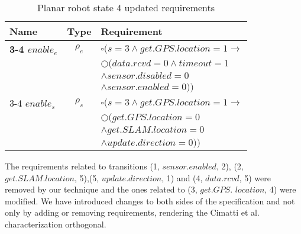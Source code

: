 \begin{center}
\begin{table}[h]
  \begin{tabular}{ l  c  l }
	Name & Type & Requirement \\
    \hline
    \textbf{3-4 $enable_e$} & $\rho_e$ & $\square(s=3 \wedge get.GPS.location = 1 \rightarrow$\\
    &&$\Circle(data.rcvd=0 \wedge timeout = 1$\\
    &&$\wedge sensor.disabled = 0$\\
    &&$\wedge sensor.enabled = 0))$\\
    3-4 $enable_s$ & $\rho_s$ & $\square(s=3 \wedge get.GPS.location = 1 \rightarrow$\\
        &&$\Circle(get.GPS.location = 0 $\\
        &&$\wedge get.SLAM.location = 0$\\
        &&$\wedge update.direction = 0))$\\
  \end{tabular}
  \caption{Planar robot state 4 updated requirements}
  \label{table:state-4-translation-updated}
 \end{table}
\end{center}

The requirements related to transitions (1, $sensor.enabled$, 2),
(2, $get.SLAM.location$, 5),(5, $update.direction$, 1)
and (4, $data.rcvd$, 5) were removed by our technique and 
the ones related to (3, $get.$$GPS.$ $location$, 4) were modified.
We have introduced changes to both sides of the specification and not only
by adding or removing requirements, rendering the Cimatti et al. characterization
orthogonal.\\
